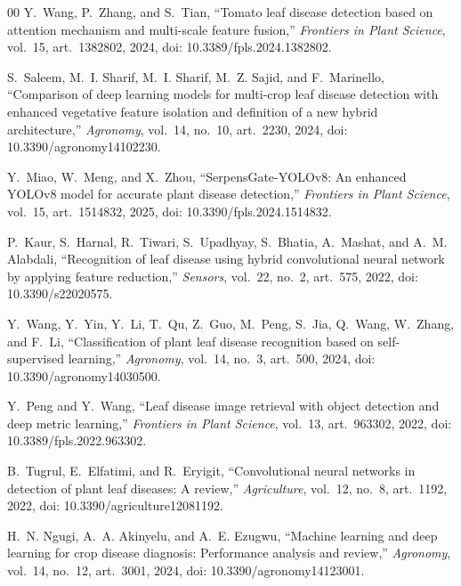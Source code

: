\documentclass[conference]{IEEEtran}
\begin{document}
\begin{thebibliography}{00}
Y.~Wang, P.~Zhang, and S.~Tian, ``Tomato leaf disease detection based on attention mechanism and multi-scale feature fusion,'' \textit{Frontiers in Plant Science}, vol.~15, art.~1382802, 2024, doi: 10.3389/fpls.2024.1382802.

S.~Saleem, M.~I. Sharif, M.~I. Sharif, M.~Z. Sajid, and F.~Marinello, ``Comparison of deep learning models for multi-crop leaf disease detection with enhanced vegetative feature isolation and definition of a new hybrid architecture,'' \textit{Agronomy}, vol.~14, no.~10, art.~2230, 2024, doi: 10.3390/agronomy14102230.

Y.~Miao, W.~Meng, and X.~Zhou, ``SerpensGate-YOLOv8: An enhanced YOLOv8 model for accurate plant disease detection,'' \textit{Frontiers in Plant Science}, vol.~15, art.~1514832, 2025, doi: 10.3390/fpls.2024.1514832.

P.~Kaur, S.~Harnal, R.~Tiwari, S.~Upadhyay, S.~Bhatia, A.~Mashat, and A.~M. Alabdali, ``Recognition of leaf disease using hybrid convolutional neural network by applying feature reduction,'' \textit{Sensors}, vol.~22, no.~2, art.~575, 2022, doi: 10.3390/s22020575.

Y.~Wang, Y.~Yin, Y.~Li, T.~Qu, Z.~Guo, M.~Peng, S.~Jia, Q.~Wang, W.~Zhang, and F.~Li, ``Classification of plant leaf disease recognition based on self-supervised learning,'' \textit{Agronomy}, vol.~14, no.~3, art.~500, 2024, doi: 10.3390/agronomy14030500.

Y.~Peng and Y.~Wang, ``Leaf disease image retrieval with object detection and deep metric learning,'' \textit{Frontiers in Plant Science}, vol.~13, art.~963302, 2022, doi: 10.3389/fpls.2022.963302.

B.~Tugrul, E.~Elfatimi, and R.~Eryigit, ``Convolutional neural networks in detection of plant leaf diseases: A review,'' \textit{Agriculture}, vol.~12, no.~8, art.~1192, 2022, doi: 10.3390/agriculture12081192.

H.~N. Ngugi, A.~A. Akinyelu, and A.~E. Ezugwu, ``Machine learning and deep learning for crop disease diagnosis: Performance analysis and review,'' \textit{Agronomy}, vol.~14, no.~12, art.~3001, 2024, doi: 10.3390/agronomy14123001.

\end{thebibliography}
\end{document}

